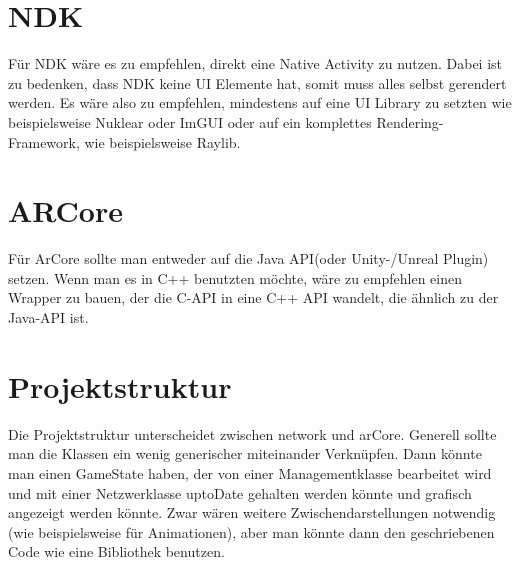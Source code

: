 \section{NDK}
Für NDK wäre es zu empfehlen, direkt eine Native Activity zu nutzen.
Dabei ist zu bedenken, dass NDK keine UI Elemente hat, somit muss alles selbst
gerendert werden. Es wäre also zu empfehlen, mindestens auf eine UI Library zu setzten
wie beispielsweise Nuklear oder ImGUI oder auf ein komplettes Rendering-Framework,
wie beispielsweise Raylib.

\section{ARCore}
Für ArCore sollte man entweder auf die Java API(oder Unity-/Unreal Plugin) setzen.
Wenn man es in C++ benutzten möchte, wäre zu empfehlen einen Wrapper zu bauen, der die
C-API in eine C++ API wandelt, die ähnlich zu der Java-API ist.

\section{Projektstruktur}
Die Projektstruktur unterscheidet zwischen network und arCore. Generell sollte man
die Klassen ein wenig generischer miteinander Verknüpfen.
Dann könnte man einen GameState haben, der von einer Managementklasse bearbeitet wird
und mit einer Netzwerklasse uptoDate gehalten werden könnte und grafisch
angezeigt werden könnte. Zwar wären weitere Zwischendarstellungen notwendig
(wie beispielsweise für Animationen),
aber man könnte dann den geschriebenen Code wie eine Bibliothek benutzen.
